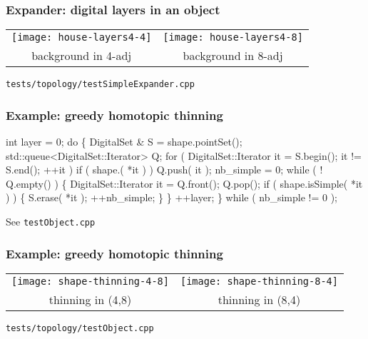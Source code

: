 \documentclass[pdftex,francais]{beamer}
\begin{document}
\begin{frame}
  \frametitle{Expander: digital layers in an object}
  \begin{center}
    \begin{tabular}{cc}
      \texttt{[image: house-layers4-4]} &
      \texttt{[image: house-layers4-8]} \\
      background in 4-adj &
      background in 8-adj \\
    \end{tabular}

    \texttt{tests/topology/testSimpleExpander.cpp}
  \end{center}
\end{frame}

\begin{frame}[fragile]
  \frametitle{Example: greedy homotopic thinning}
    \scriptsize
    \begin{semiverbatim}
  int layer = 0;
  do \{
      DigitalSet & S = shape.pointSet();
      std::queue<DigitalSet::Iterator> Q;
      for ( DigitalSet::Iterator it = S.begin(); it != S.end(); ++it )
        if ( shape.( *it ) )
          Q.push( it );
      nb_simple = 0;
      while ( ! Q.empty() ) \{
        DigitalSet::Iterator it = Q.front();
        Q.pop();
        if ( shape.isSimple( *it ) ) \{
          S.erase( *it );
          ++nb_simple;
        \}
      \}
      ++layer;
  \} while ( nb_simple != 0 );
    \end{semiverbatim}
    \normalsize
    See \texttt{testObject.cpp}
\end{frame}

\begin{frame}[fragile]
  \frametitle{Example: greedy homotopic thinning}
  \begin{center}
    \begin{tabular}{cc}
      \texttt{[image: shape-thinning-4-8]} &
      \texttt{[image: shape-thinning-8-4]} \\
      thinning in (4,8) &
      thinning in (8,4) \\
    \end{tabular}

    \texttt{tests/topology/testObject.cpp}
  \end{center}
\end{frame}
\end{document}

